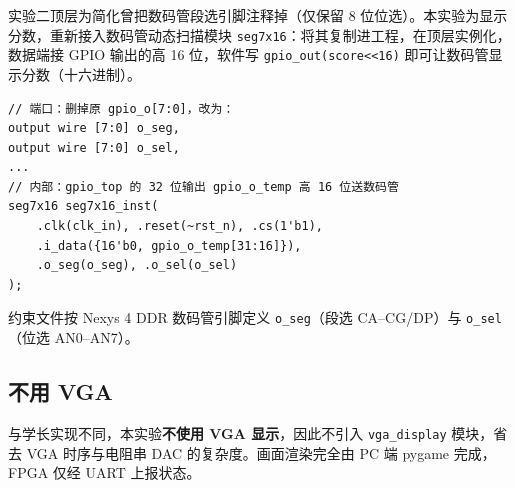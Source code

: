 实验二顶层为简化曾把数码管段选引脚注释掉（仅保留 8 位位选）。本实验为显示分数，重新接入数码管动态扫描模块 \texttt{seg7x16}：将其复制进工程，在顶层实例化，数据端接 GPIO 输出的高 16 位，软件写 \texttt{gpio\_out(score<<16)} 即可让数码管显示分数（十六进制）。

\begin{lstlisting}[style=verilog, caption={顶层加回 seg7x16 实例（openmips\_min\_sopc.v）}]
// 端口：删掉原 gpio_o[7:0]，改为：
output wire [7:0] o_seg,
output wire [7:0] o_sel,
...
// 内部：gpio_top 的 32 位输出 gpio_o_temp 高 16 位送数码管
seg7x16 seg7x16_inst(
    .clk(clk_in), .reset(~rst_n), .cs(1'b1),
    .i_data({16'b0, gpio_o_temp[31:16]}),
    .o_seg(o_seg), .o_sel(o_sel)
);
\end{lstlisting}

约束文件按 Nexys 4 DDR 数码管引脚定义 \texttt{o\_seg}（段选 CA--CG/DP）与 \texttt{o\_sel}（位选 AN0--AN7）。

\subsection{不用 VGA}

与学长实现不同，本实验\textbf{不使用 VGA 显示}，因此不引入 \texttt{vga\_display} 模块，省去 VGA 时序与电阻串 DAC 的复杂度。画面渲染完全由 PC 端 pygame 完成，FPGA 仅经 UART 上报状态。
